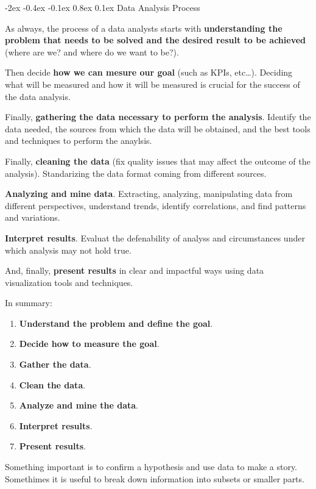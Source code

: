 \documentclass[12pt]{report}
\makeatletter
\renewcommand{\subsection}{\@startsection{subsection}{2}{\z@}%
  {-2ex \@plus -0.4ex \@minus -0.1ex}%
  {0.8ex \@plus 0.1ex}%
  {\normalfont\large\subsectionstyle}}
\newcommand{\subsectionstyle}[1]{%
  \par\noindent\hrule
  \vspace{-0.4ex}%
  {\scshape #1\par}%
  \vspace{0.4ex}%
  \hrule
}
\theoremstyle{largebreak}
\makeatother
\begin{document}
    \subsection{Data Analysis Process}

    As always, the process of a data analysts starts with \textbf{understanding the problem that needs to be solved and the desired result to be achieved} (where are we? and where do we want to be?).

    Then decide \textbf{how we can mesure our goal} (such as KPIs, etc\dots). Deciding what will be measured and how it will be measured is crucial for the success of the data analysis.

    Finally, \textbf{gathering the data necessary to perform the analysis}. Identify the data needed, the sources from which the data will be obtained, and the best tools and techniques to perform the anaylsis.

    Finally, \textbf{cleaning the data} (fix quality issues that may affect the outcome of the analysis). Standarizing the data format coming from different sources.

    \textbf{Analyzing and mine data}. Extracting, analyzing, manipulating data from different perspectives, understand trends, identify correlations, and find patterns and variations.

    \textbf{Interpret results}. Evaluat the defenability of analyss and circumstances under which analysis may not hold true.

    And, finally, \textbf{present results} in clear and impactful ways using data visualization tools and techniques.

    In summary:
    \begin{enumerate}[label = \textit{(\arabic*)}]
        \item \textbf{Understand the problem and define the goal}.
        \item \textbf{Decide how to measure the goal}.
        \item \textbf{Gather the data}.
        \item \textbf{Clean the data}.
        \item \textbf{Analyze and mine the data}.
        \item \textbf{Interpret results}.
        \item \textbf{Present results}.
    \end{enumerate}

    \begin{obs}
        Something important is to confirm a hypothesis and use data to make a story. Somethimes it is useful to break down information into subsets or smaller parts.
    \end{obs}
\end{document}
